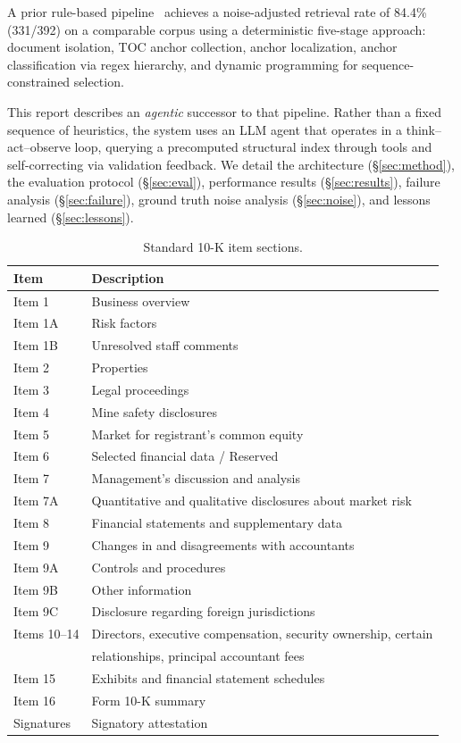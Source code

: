 \documentclass[11pt,a4paper]{article}
\begin{document}
A prior rule-based pipeline~\cite{bi2026anchor} achieves a noise-adjusted retrieval rate of 84.4\% (331/392) on a comparable corpus using a deterministic five-stage approach: document isolation, TOC anchor collection, anchor localization, anchor classification via regex hierarchy, and dynamic programming for sequence-constrained selection.

This report describes an \emph{agentic} successor to that pipeline. Rather than a fixed sequence of heuristics, the system uses an LLM agent that operates in a think--act--observe loop, querying a precomputed structural index through tools and self-correcting via validation feedback. We detail the architecture (\S\ref{sec:method}), the evaluation protocol (\S\ref{sec:eval}), performance results (\S\ref{sec:results}), failure analysis (\S\ref{sec:failure}), ground truth noise analysis (\S\ref{sec:noise}), and lessons learned (\S\ref{sec:lessons}).

\begin{table}[H]
\centering
\caption{Standard 10-K item sections.}
\label{tab:items}
\begin{tabular}{ll}
\toprule
\textbf{Item} & \textbf{Description}\\
\midrule
Item 1 & Business overview\\
Item 1A & Risk factors\\
Item 1B & Unresolved staff comments\\
Item 2 & Properties\\
Item 3 & Legal proceedings\\
Item 4 & Mine safety disclosures\\
Item 5 & Market for registrant's common equity\\
Item 6 & Selected financial data / Reserved\\
Item 7 & Management's discussion and analysis\\
Item 7A & Quantitative and qualitative disclosures about market risk\\
Item 8 & Financial statements and supplementary data\\
Item 9 & Changes in and disagreements with accountants\\
Item 9A & Controls and procedures\\
Item 9B & Other information\\
Item 9C & Disclosure regarding foreign jurisdictions\\
Items 10--14 & Directors, executive compensation, security ownership, certain\\
& relationships, principal accountant fees\\
Item 15 & Exhibits and financial statement schedules\\
Item 16 & Form 10-K summary\\
Signatures & Signatory attestation\\
\bottomrule
\end{tabular}
\end{table}
\end{document}
